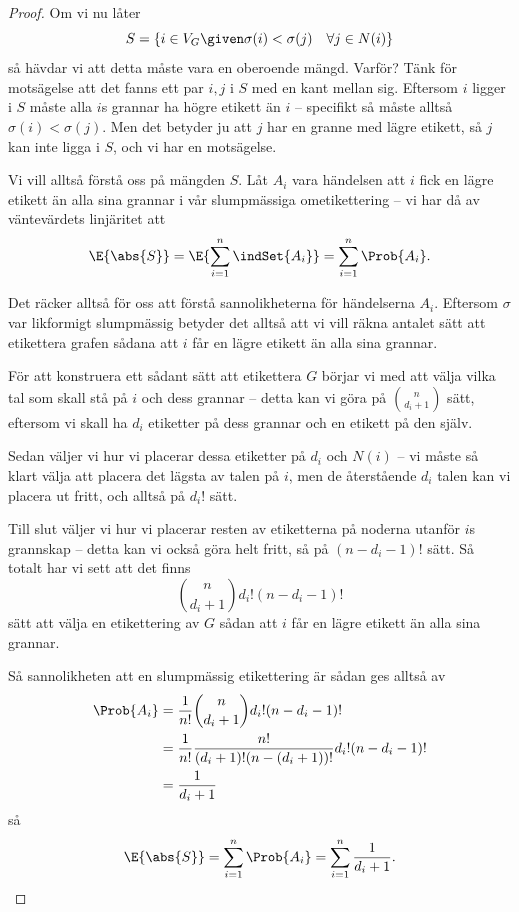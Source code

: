 \documentclass[nobib]{tufte-handout}
\begin{document}
\begin{theorem}
\begin{proof}
        Om vi nu låter
        $$S = \left\{i \in V_G \given \sigma(i) < \sigma(j)\quad \forall j \in N(i)\right\}$$
        så hävdar vi att detta måste vara en oberoende mängd. Varför? Tänk för motsägelse att det fanns ett par $i, j$ i $S$ med en kant mellan sig. Eftersom $i$ ligger i $S$ måste alla $i$s grannar ha högre etikett än $i$ -- specifikt så måste alltså $\sigma(i) < \sigma(j)$. Men det betyder ju att $j$ har en granne med lägre etikett, så $j$ kan inte ligga i $S$, och vi har en motsägelse.

        Vi vill alltså förstå oss på mängden $S$. Låt $A_i$ vara händelsen att $i$ fick en lägre etikett än alla sina grannar i vår slumpmässiga ometikettering -- vi har då av väntevärdets linjäritet att
        $$\E{\abs{S}} = \E{\sum_{i=1}^{n} \indSet{A_i}} = \sum_{i=1}^{n} \Prob{A_i}.$$
        
        Det räcker alltså för oss att förstå sannolikheterna för händelserna $A_i$. Eftersom $\sigma$ var likformigt slumpmässig betyder det alltså att vi vill räkna antalet sätt att etikettera grafen sådana att $i$ får en lägre etikett än alla sina grannar.

        För att konstruera ett sådant sätt att etikettera $G$ börjar vi med att välja vilka tal som skall stå på $i$ och dess grannar -- detta kan vi göra på $\binom{n}{d_i + 1}$ sätt, eftersom vi skall ha $d_i$ etiketter på dess grannar och en etikett på den själv.

        Sedan väljer vi hur vi placerar dessa etiketter på $d_i$ och $N(i)$ -- vi måste så klart välja att placera det lägsta av talen på $i$, men de återstående $d_i$ talen kan vi placera ut fritt, och alltså på $d_i!$ sätt.

        Till slut väljer vi hur vi placerar resten av etiketterna på noderna utanför $i$s grannskap -- detta kan vi också göra helt fritt, så på $(n - d_i - 1)!$ sätt. Så totalt har vi sett att det finns
        $$\binom{n}{d_i + 1} d_i! (n - d_i - 1)!$$
        sätt att välja en etikettering av $G$ sådan att $i$ får en lägre etikett än alla sina grannar.

        Så sannolikheten att en slumpmässig etikettering är sådan ges alltså av
        \begin{align*}
            \Prob{A_i} &= \frac{1}{n!}\binom{n}{d_i + 1} d_i! (n - d_i - 1)!\\
            &= \frac{1}{n!}\frac{n!}{(d_i + 1)!(n - (d_i + 1))!}d_i! (n - d_i - 1)!\\
            &= \frac{1}{d_i + 1}
        \end{align*}
        så
        $$\E{\abs{S}} = \sum_{i=1}^{n} \Prob{A_i} = \sum_{i=1}^{n} \frac{1}{d_i + 1}.$$


\end{proof}
\end{theorem}
\end{document}

